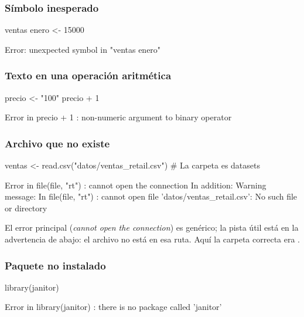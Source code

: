 \subsubsection{Símbolo inesperado}

\begin{rnoejecutar}
ventas enero <- 15000
\end{rnoejecutar}
\begin{rsalida}
Error: unexpected symbol in "ventas enero"
\end{rsalida}

\subsubsection{Texto en una operación aritmética}

\begin{rnoejecutar}
precio <- "100"
precio + 1
\end{rnoejecutar}
\begin{rsalida}
Error in precio + 1 : non-numeric argument to binary operator
\end{rsalida}

\subsubsection{Archivo que no existe}

\begin{rnoejecutar}
ventas <- read.csv("datos/ventas_retail.csv")    # La carpeta es datasets
\end{rnoejecutar}
\begin{rsalida}
Error in file(file, "rt") : cannot open the connection
In addition: Warning message:
In file(file, "rt") :
  cannot open file 'datos/ventas_retail.csv': No such file or directory
\end{rsalida}

El error principal (\emph{cannot open the connection}) es genérico; la
pista útil está en la advertencia de abajo: el archivo no está en esa
ruta. Aquí la carpeta correcta era .

\subsubsection{Paquete no instalado}

\begin{rnoejecutar}
library(janitor)
\end{rnoejecutar}
\begin{rsalida}
Error in library(janitor) : there is no package called 'janitor'
\end{rsalida}

